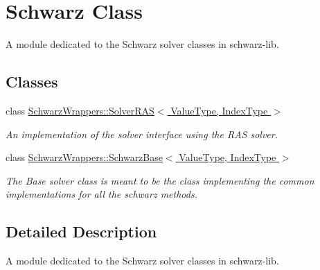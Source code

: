 \hypertarget{group__schwarz__class}{}\section{Schwarz Class}
\label{group__schwarz__class}


A module dedicated to the Schwarz solver classes in schwarz-\/lib.  


\subsection*{Classes}
\begin{DoxyCompactItemize}
\item 
class \hyperlink{classSchwarzWrappers_1_1SolverRAS}{Schwarz\+Wrappers\+::\+Solver\+R\+A\+S$<$ Value\+Type, Index\+Type $>$}
\begin{DoxyCompactList}\small\item\em An implementation of the solver interface using the R\+AS solver. \end{DoxyCompactList}\item 
class \hyperlink{classSchwarzWrappers_1_1SchwarzBase}{Schwarz\+Wrappers\+::\+Schwarz\+Base$<$ Value\+Type, Index\+Type $>$}
\begin{DoxyCompactList}\small\item\em The Base solver class is meant to be the class implementing the common implementations for all the schwarz methods. \end{DoxyCompactList}\end{DoxyCompactItemize}


\subsection{Detailed Description}
A module dedicated to the Schwarz solver classes in schwarz-\/lib. 

